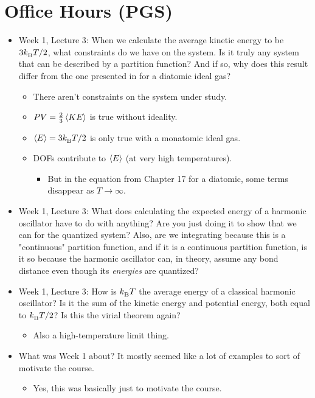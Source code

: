 \documentclass[../notes.tex]{subfiles}
\begin{document}
\section{Office Hours (PGS)}
\begin{itemize}
    \item Week 1, Lecture 3: When we calculate the average kinetic energy to be $3{k_\text{B}^{}} T/2$, what constraints do we have on the system. Is it truly any system that can be described by a partition function? And if so, why does this result differ from the one presented in \textcite{bib:McQuarrieSimon} for a diatomic ideal gas?
    \begin{itemize}
        \item There aren't constraints on the system under study.
        \item $PV=\frac{2}{3}\left\langle{KE}\right\rangle$ is true without ideality.
        \item $\left\langle{E}\right\rangle=3{k_\text{B}^{}} T/2$ is only true with a monatomic ideal gas.
        \item DOFs contribute to $\left\langle{E}\right\rangle$ (at very high temperatures).
        \begin{itemize}
            \item But in the equation from Chapter 17 for a diatomic, some terms disappear as $T\to\infty$.
        \end{itemize}
    \end{itemize}
    \item Week 1, Lecture 3: What does calculating the expected energy of a harmonic oscillator have to do with anything? Are you just doing it to show that we can for the quantized system? Also, are we integrating because this is a "continuous" partition function, and if it is a continuous partition function, is it so because the harmonic oscillator can, in theory, assume any bond distance even though its \emph{energies} are quantized?
    \item Week 1, Lecture 3: How is ${k_\text{B}^{}} T$ the average energy of a classical harmonic oscillator? Is it the sum of the kinetic energy and potential energy, both equal to ${k_\text{B}^{}} T/2$? Is this the virial theorem again?
    \begin{itemize}
        \item Also a high-temperature limit thing.
    \end{itemize}
    \item What was Week 1 about? It mostly seemed like a lot of examples to sort of motivate the course.
    \begin{itemize}
        \item Yes, this was basically just to motivate the course.

\end{itemize}
\end{itemize}
\end{document}
